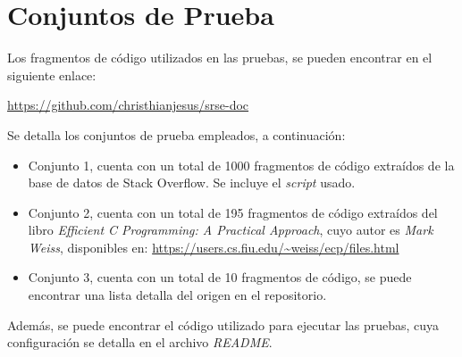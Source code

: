 \chapter{Conjuntos de Prueba}
\label{ape:conj}

Los fragmentos de código utilizados en las pruebas,
se pueden encontrar en el siguiente enlace:

\url{https://github.com/christhianjesus/srse-doc}

Se detalla los conjuntos de prueba empleados, a continuación:

\begin{itemize}
  \item Conjunto 1, cuenta con un total de 1000 fragmentos de código extraídos
  de la base de datos de Stack Overflow. Se incluye el \textit{script} usado.
  \item Conjunto 2, cuenta con un total de 195 fragmentos de código extraídos
  del libro \textit{Efficient C Programming: A Practical Approach},
  cuyo autor es \textit{Mark Weiss}, disponibles en:
  \url{https://users.cs.fiu.edu/~weiss/ecp/files.html}
  \item Conjunto 3, cuenta con un total de 10 fragmentos de código,
  se puede encontrar una lista detalla del origen en el repositorio.
\end{itemize}

Además, se puede encontrar el código utilizado para ejecutar las pruebas,
cuya configuración se detalla en el archivo \textit{README}.